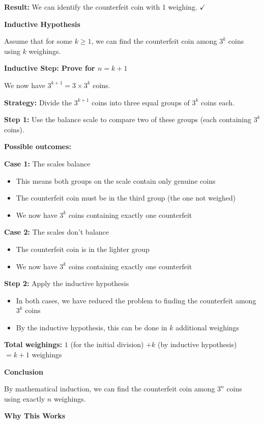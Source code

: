 \documentclass[12pt,a4paper]{article}
\theoremstyle{definition}
\theoremstyle{remark}
\begin{document}
\textbf{Result:} We can identify the counterfeit coin with 1 weighing. $\checkmark$

\textbf{Inductive Hypothesis}

Assume that for some $k \geq 1$, we can find the counterfeit coin among $3^k$ coins using $k$ weighings.

\textbf{Inductive Step: Prove for $n = k+1$}

We now have $3^{k+1} = 3 \times 3^k$ coins.

\textbf{Strategy:} Divide the $3^{k+1}$ coins into three equal groups of $3^k$ coins each.

\textbf{Step 1:} Use the balance scale to compare two of these groups (each containing $3^k$ coins).

\textbf{Possible outcomes:}

\textbf{Case 1:} The scales balance
\begin{itemize}
\item This means both groups on the scale contain only genuine coins
\item The counterfeit coin must be in the third group (the one not weighed)
\item We now have $3^k$ coins containing exactly one counterfeit
\end{itemize}

\textbf{Case 2:} The scales don't balance
\begin{itemize}
\item The counterfeit coin is in the lighter group
\item We now have $3^k$ coins containing exactly one counterfeit
\end{itemize}

\textbf{Step 2:} Apply the inductive hypothesis
\begin{itemize}
\item In both cases, we have reduced the problem to finding the counterfeit among $3^k$ coins
\item By the inductive hypothesis, this can be done in $k$ additional weighings
\end{itemize}

\textbf{Total weighings:} $1$ (for the initial division) $+ k$ (by inductive hypothesis) $= k + 1$ weighings

\textbf{Conclusion}

By mathematical induction, we can find the counterfeit coin among $3^n$ coins using exactly $n$ weighings.

\textbf{Why This Works}
\end{document}
